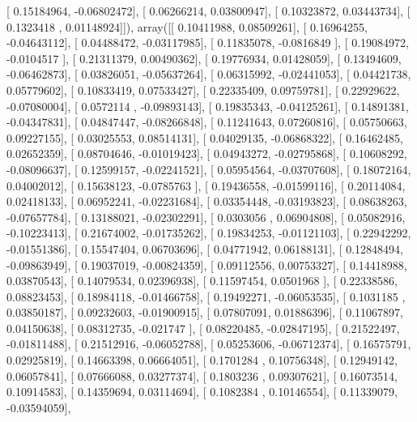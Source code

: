 \documentclass{article}
\begin{document}
       [ 0.15184964, -0.06802472],
       [ 0.06266214,  0.03800947],
       [ 0.10323872,  0.03443734],
       [ 0.1323418 ,  0.01148924]]), array([[ 0.10411988,  0.08509261],
       [ 0.16964255, -0.04643112],
       [ 0.04488472, -0.03117985],
       [ 0.11835078, -0.0816849 ],
       [ 0.19084972, -0.0104517 ],
       [ 0.21311379,  0.00490362],
       [ 0.19776934,  0.01428059],
       [ 0.13494609, -0.06462873],
       [ 0.03826051, -0.05637264],
       [ 0.06315992, -0.02441053],
       [ 0.04421738,  0.05779602],
       [ 0.10833419,  0.07533427],
       [ 0.22335409,  0.09759781],
       [ 0.22929622, -0.07080004],
       [ 0.0572114 , -0.09893143],
       [ 0.19835343, -0.04125261],
       [ 0.14891381, -0.04347831],
       [ 0.04847447, -0.08266848],
       [ 0.11241643,  0.07260816],
       [ 0.05750663,  0.09227155],
       [ 0.03025553,  0.08514131],
       [ 0.04029135, -0.06868322],
       [ 0.16462485,  0.02652359],
       [ 0.08704646, -0.01019423],
       [ 0.04943272, -0.02795868],
       [ 0.10608292, -0.08096637],
       [ 0.12599157, -0.02241521],
       [ 0.05954564, -0.03707608],
       [ 0.18072164,  0.04002012],
       [ 0.15638123, -0.0785763 ],
       [ 0.19436558, -0.01599116],
       [ 0.20114084,  0.02418133],
       [ 0.06952241, -0.02231684],
       [ 0.03354448, -0.03193823],
       [ 0.08638263, -0.07657784],
       [ 0.13188021, -0.02302291],
       [ 0.0303056 ,  0.06904808],
       [ 0.05082916, -0.10223413],
       [ 0.21674002, -0.01735262],
       [ 0.19834253, -0.01121103],
       [ 0.22942292, -0.01551386],
       [ 0.15547404,  0.06703696],
       [ 0.04771942,  0.06188131],
       [ 0.12848494, -0.09863949],
       [ 0.19037019, -0.00824359],
       [ 0.09112556,  0.00753327],
       [ 0.14418988,  0.03870543],
       [ 0.14079534,  0.02396938],
       [ 0.11597454,  0.0501968 ],
       [ 0.22338586,  0.08823453],
       [ 0.18984118, -0.01466758],
       [ 0.19492271, -0.06053535],
       [ 0.1031185 ,  0.03850187],
       [ 0.09232603, -0.01900915],
       [ 0.07807091,  0.01886396],
       [ 0.11067897,  0.04150638],
       [ 0.08312735, -0.021747  ],
       [ 0.08220485, -0.02847195],
       [ 0.21522497, -0.01811488],
       [ 0.21512916, -0.06052788],
       [ 0.05253606, -0.06712374],
       [ 0.16575791,  0.02925819],
       [ 0.14663398,  0.06664051],
       [ 0.1701284 ,  0.10756348],
       [ 0.12949142,  0.06057841],
       [ 0.07666088,  0.03277374],
       [ 0.1803236 ,  0.09307621],
       [ 0.16073514,  0.10914583],
       [ 0.14359694,  0.03114694],
       [ 0.1082384 ,  0.10146554],
       [ 0.11339079, -0.03594059],
\end{document}
